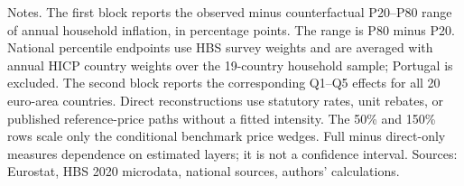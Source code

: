 \begin{table}[H]
\small
\setlength{\tabcolsep}{4pt}

\caption{\label{tab:ea20-policy-method-sensitivity}Sensitivity of euro-area inflation-inequality effects to counterfactual construction methods}
\centering
{}%
\begin{flushleft}
\footnotesize{Notes. The first block reports the observed minus counterfactual P20--P80 range of annual household inflation, in percentage points. The range is P80 minus P20. National percentile endpoints use HBS survey weights and are averaged with annual HICP country weights over the 19-country household sample; Portugal is excluded. The second block reports the corresponding Q1--Q5 effects for all 20 euro-area countries. Direct reconstructions use statutory rates, unit rebates, or published reference-price paths without a fitted intensity. The 50\% and 150\% rows scale only the conditional benchmark price wedges. Full minus direct-only measures dependence on estimated layers; it is not a confidence interval. Sources: Eurostat, HBS 2020 microdata, national sources, authors' calculations.}
\end{flushleft}
\end{table}
